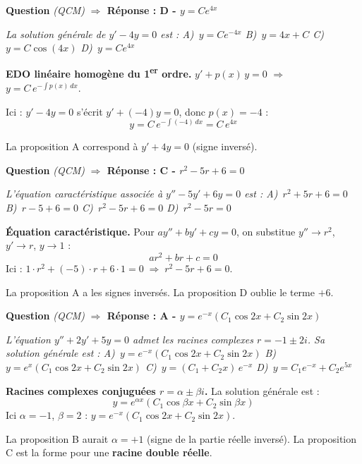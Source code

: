 \documentclass[11pt,a4paper]{article}
\newcounter{qnum}
\newcommand{\qtitre}[2]{%
  \stepcounter{qnum}%
  \medskip\noindent
  \textbf{\color{bleutexte}Question \theqnum}\enspace
  \textit{(#1)}\enspace
  \textcolor{vertok}{\textbf{$\Rightarrow$ Réponse : #2}}
  \par\smallskip
}
\newcommand{\qenonce}[1]{%
  \begin{mdframed}[backgroundcolor=grisbox, linewidth=0pt,
    innerleftmargin=8pt, innerrightmargin=8pt,
    innertopmargin=5pt, innerbottommargin=5pt,
    skipabove=2pt, skipbelow=4pt]
  \small\textit{#1}
  \end{mdframed}
}
\begin{document}
\qtitre{QCM}{D - $y = Ce^{4x}$}
\qenonce{La solution générale de $y' - 4y = 0$ est :
\quad A)~$y = Ce^{-4x}$
\quad B)~$y = 4x + C$
\quad C)~$y = C\cos(4x)$
\quad D)~$y = Ce^{4x}$}

\begin{methodebox}
\textbf{EDO linéaire homogène du 1\textsuperscript{er} ordre.} $y' + p(x)\,y = 0$ $\Rightarrow$ $y = C\,e^{-\int p(x)\,dx}$.

Ici : $y' - 4y = 0$ s'écrit $y' + (-4)y = 0$, donc $p(x) = -4$ :
$$y = C\,e^{-\int(-4)\,dx} = C\,e^{4x}$$
\end{methodebox}

La proposition A correspond à $y' + 4y = 0$ (signe inversé).

\qtitre{QCM}{C - $r^2 - 5r + 6 = 0$}
\qenonce{L'équation caractéristique associée à $y'' - 5y' + 6y = 0$ est :
\quad A)~$r^2 + 5r + 6 = 0$
\quad B)~$r - 5 + 6 = 0$
\quad C)~$r^2 - 5r + 6 = 0$
\quad D)~$r^2 - 5r = 0$}

\begin{methodebox}
\textbf{Équation caractéristique.} Pour $ay'' + by' + cy = 0$, on substitue $y'' \to r^2$, $y' \to r$, $y \to 1$ :
$$ar^2 + br + c = 0$$
Ici : $1\cdot r^2 + (-5)\cdot r + 6\cdot 1 = 0 \;\Rightarrow\; r^2 - 5r + 6 = 0$.
\end{methodebox}

La proposition A a les signes inversés. La proposition D oublie le terme $+6$.

\qtitre{QCM}{A - $y = e^{-x}(C_1\cos 2x + C_2\sin 2x)$}
\qenonce{L'équation $y'' + 2y' + 5y = 0$ admet les racines complexes $r = -1 \pm 2i$. Sa solution générale est :
\quad A)~$y = e^{-x}(C_1\cos 2x + C_2\sin 2x)$
\quad B)~$y = e^{x}(C_1\cos 2x + C_2\sin 2x)$
\quad C)~$y = (C_1 + C_2 x)\,e^{-x}$
\quad D)~$y = C_1 e^{-x} + C_2 e^{5x}$}

\begin{methodebox}
\textbf{Racines complexes conjuguées $r = \alpha \pm \beta i$.} La solution générale est :
$$y = e^{\alpha x}(C_1\cos\beta x + C_2\sin\beta x)$$
Ici $\alpha = -1$, $\beta = 2$ : $y = e^{-x}(C_1\cos 2x + C_2\sin 2x)$.
\end{methodebox}

La proposition B aurait $\alpha = +1$ (signe de la partie réelle inversé). La proposition C est la forme pour une \textbf{racine double réelle}.
\end{document}
